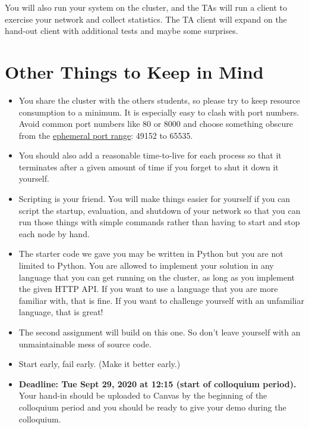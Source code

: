 \documentclass[a4paper]{article}
\def\duedate{Tue Sept 29, 2020 at 12:15 (start of colloquium period)}
\begin{document}
You will also run your system on the cluster,
and the TAs will run a client to exercise your network and collect statistics.
The TA client will expand on the hand-out client with additional tests and maybe some surprises.

\section{Other Things to Keep in Mind}

\begin{itemize}

    \item You share the cluster with the others students, so please try to keep resource consumption to a minimum.
        It is especially easy to clash with port numbers.
        Avoid common port numbers like 80 or 8000 and choose something obscure from the \href{https://en.wikipedia.org/wiki/Ephemeral_port}{ephemeral port range}: 49152 to 65535.

    \item You should also add a reasonable time-to-live for each process so that it terminates after a given amount of time if you forget to shut it down it yourself.

    \item Scripting is your friend.
        You will make things easier for yourself if you can script the startup, evaluation, and shutdown of your network so that you can run those things with simple commands rather than having to start and stop each node by hand.

\item The starter code we gave you may be written in Python but you are not limited to Python.
    You are allowed to implement your solution in any language that you can get running on the cluster, as long as you implement the given HTTP API.
    If you want to use a language that you are more familiar with,
    that is fine.
    If you want to challenge yourself with an unfamiliar language,
    that is great!

\item The second assignment will build on this one.
    So don't leave yourself with an unmaintainable mess of source code.

\item Start early, fail early. (Make it better early.)

\item \textbf{Deadline: \duedate{}.}
    Your hand-in should be uploaded to Canvas by the beginning of the
    colloquium period and you should be ready to give your demo during the colloquium.

\end{itemize}

\printbibliography
\end{document}
